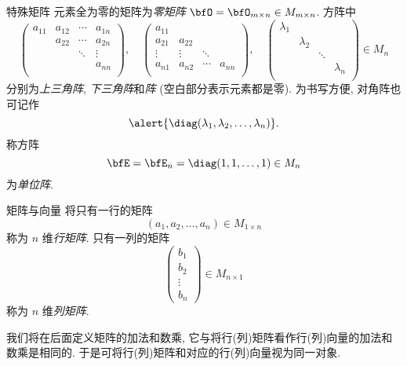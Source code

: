 \begin{frame}{特殊矩阵}
	\onslide<+->
	元素全为零的矩阵为\emph{零矩阵} $\bfO=\bfO_{m\times n}\in M_{m\times n}$.
	\onslide<+->
	方阵中
	\[\begin{pmatrix}
		a_{11}&a_{12}&\cdots&a_{1n}\\
		&a_{22}&\cdots&a_{2n}\\
		&&\ddots&\vdots\\
		&&&a_{nn}\\
	\end{pmatrix},\quad\begin{pmatrix}
		a_{11}&&&\\
		a_{21}&a_{22}&&\\
		\vdots&\vdots&\ddots&\\
		a_{n1}&a_{n2}&\cdots&a_{nn}\\
	\end{pmatrix},\quad\begin{pmatrix}
		\lambda_1&&&\\
		&\lambda_2&&\\
		&&\ddots&\\
		&&&\lambda_n\\
	\end{pmatrix}\in M_n\]
	分别为\emph{上三角阵}, \emph{下三角阵}和\emph{阵} (空白部分表示元素都是零).
	\onslide<+->
	为书写方便, 对角阵也可记作
	\[\alert{\diag(\lambda_1,\lambda_2,\dots,\lambda_n)}.\]
	\onslide<+->
	称方阵
	\[\bfE=\bfE_n=\diag(1,1,\dots,1)\in M_n\]
	为\emph{单位阵}.
\end{frame}


\begin{frame}{矩阵与向量}
	\onslide<+->
	将只有一行的矩阵
	\[(a_1,a_2,\dots,a_n)\in M_{1\times n}\]
	称为 $n$ 维\emph{行矩阵}.
	\onslide<+->
	只有一列的矩阵
	\[\begin{pmatrix}
		b_1\\b_2\\\vdots\\b_n
	\end{pmatrix}\in M_{n\times 1}\]
	称为 $n$ 维\emph{列矩阵}.

	\onslide<+->
	我们将在后面定义矩阵的加法和数乘, 它与将行(列)矩阵看作行(列)向量的加法和数乘是相同的.
	\onslide<+->
	于是可将行(列)矩阵和对应的行(列)向量视为同一对象.
\end{frame}


